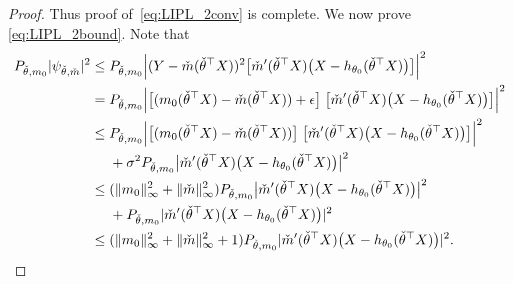 {\begin{proof}
Thus proof of~\eqref{eq:LIPL_2conv} is complete. We now prove \eqref{eq:LIPL_2bound}. Note that
\begin{align}\label{eq:psi_bound}
\begin{split}
P_{\check{\theta}, m_0} |\psi_{\check{\theta},\check{m}}|^2
\le{}& P_{\check{\theta}, m_0} \Big| (Y-\check{m}(\check{\theta} ^\top X))^2 \big[ \check{m}^\prime(\check{\theta}^\top X) \big(X - h_{\theta_0}(\check{\theta} ^\top X)\big)\big] \Big|^2\\
={}& P_{\check{\theta}, m_0} \Big| \big[(m_0(\check{\theta} ^\top X)-\check{m}(\check{\theta} ^\top X))+\epsilon\big] \;\big[ \check{m}^\prime(\check{\theta}^\top X) \big(X -h_{\theta_0}(\check{\theta} ^\top X)\big)\big]\Big|^2\\
\le{}& P_{\check{\theta}, m_0} \Big| \big[(m_0(\check{\theta} ^\top X)-\check{m}(\check{\theta} ^\top X))\big] \;\big[ \check{m}^\prime(\check{\theta}^\top X) \big(X -h_{\theta_0}(\check{\theta} ^\top X)\big)\big]\Big|^2\\
& + \sigma^2 P_{\check{\theta}, m_0} \big| \check{m}^\prime(\check{\theta}^\top X) \big(X -h_{\theta_0}(\check{\theta} ^\top X)\big)\big|^2\\
\le{}&(\|m_0\|_\infty ^2 + \|\check{m}\|_\infty^2) P_{\check{\theta}, m_0} \big|  \check{m}^\prime(\check{\theta}^\top X) \big(X -h_{\theta_0}(\check{\theta} ^\top X)\big)\big|^2\\
& + P_{\check{\theta}, m_0} | \check{m}^\prime(\check{\theta}^\top X) \big(X -h_{\theta_0}(\check{\theta} ^\top X)\big)|^2\\
\le{}&(\|m_0\|_\infty ^2 + \|\check{m}\|_\infty^2 + 1) P_{\check{\theta}, m_0} |  \check{m}^\prime(\check{\theta}^\top X) \big(X -h_{\theta_0}(\check{\theta} ^\top X)\big)|^2. \qedhere
\end{split}
\end{align}
\end{proof}



}
